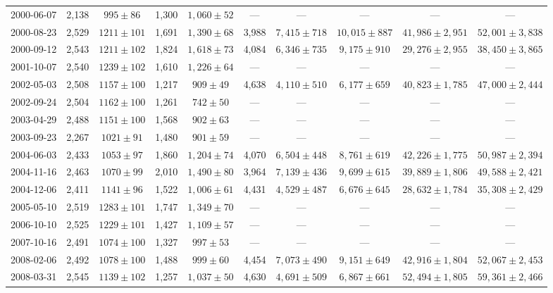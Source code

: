 \begin{landscape}
\begin{longtable}{cccccccccc}
{2000-06-07} & 2,138 & {$995  \pm  86$} & 1,300 & {$1,060 \pm 52$} & --- & --- & --- & --- & --- \\
{2000-08-23} & 2,529 & {$1211  \pm  101$} & 1,691 & {$1,390 \pm 68$} & 3,988 & {$7,415 \pm 718$} & {$10,015 \pm 887$} & {$41,986 \pm 2,951$} & {$52,001 \pm 3,838$} \\
{2000-09-12} & 2,543 & {$1211  \pm  102$} & 1,824 & {$1,618 \pm 73$} & 4,084 & {$6,346 \pm 735$} & {$9,175 \pm 910$} & {$29,276 \pm 2,955$} & {$38,450 \pm 3,865$} \\
{2001-10-07} & 2,540 & {$1239  \pm  102$} & 1,610 & {$1,226 \pm 64$} & --- & --- & --- & --- & --- \\
{2002-05-03} & 2,508 & {$1157  \pm  100$} & 1,217 & {$909 \pm 49$} & 4,638 & {$4,110 \pm 510$} & {$6,177 \pm 659$} & {$40,823 \pm 1,785$} & {$47,000 \pm 2,444$} \\
{2002-09-24} & 2,504 & {$1162  \pm  100$} & 1,261 & {$742 \pm 50$} & --- & --- & --- & --- & --- \\
{2003-04-29} & 2,488 & {$1151  \pm  100$} & 1,568 & {$902 \pm 63$} & --- & --- & --- & --- & --- \\
{2003-09-23} & 2,267 & {$1021  \pm  91$} & 1,480 & {$901 \pm 59$} & --- & --- & --- & --- & --- \\
{2004-06-03} & 2,433 & {$1053  \pm  97$} & 1,860 & {$1,204 \pm 74$} & 4,070 & {$6,504 \pm 448$} & {$8,761 \pm 619$} & {$42,226 \pm 1,775$} & {$50,987 \pm 2,394$} \\
{2004-11-16} & 2,463 & {$1070  \pm  99$} & 2,010 & {$1,490 \pm 80$} & 3,964 & {$7,139 \pm 436$} & {$9,699 \pm 615$} & {$39,889 \pm 1,806$} & {$49,588 \pm 2,421$} \\
{2004-12-06} & 2,411 & {$1141  \pm  96$} & 1,522 & {$1,006 \pm 61$} & 4,431 & {$4,529 \pm 487$} & {$6,676 \pm 645$} & {$28,632 \pm 1,784$} & {$35,308 \pm 2,429$} \\
{2005-05-10} & 2,519 & {$1283  \pm  101$} & 1,747 & {$1,349 \pm 70$} & --- & --- & --- & --- & --- \\
{2006-10-10} & 2,525 & {$1229  \pm  101$} & 1,427 & {$1,109 \pm 57$} & --- & --- & --- & --- & --- \\
{2007-10-16} & 2,491 & {$1074  \pm  100$} & 1,327 & {$997 \pm 53$} & --- & --- & --- & --- & --- \\
{2008-02-06} & 2,492 & {$1078  \pm  100$} & 1,488 & {$999 \pm 60$} & 4,454 & {$7,073 \pm 490$} & {$9,151 \pm 649$} & {$42,916 \pm 1,804$} & {$52,067 \pm 2,453$} \\
{2008-03-31} & 2,545 & {$1139  \pm  102$} & 1,257 & {$1,037 \pm 50$} & 4,630 & {$4,691 \pm 509$} & {$6,867 \pm 661$} & {$52,494 \pm 1,805$} & {$59,361 \pm 2,466$} \\

\end{longtable}
\end{landscape}

